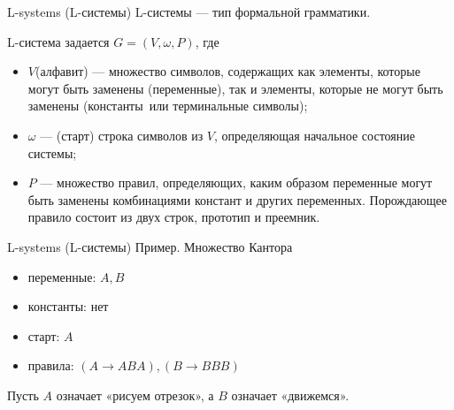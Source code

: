 \documentclass{beamer}
\begin{document}
\begin{frame}{L-systems (L-системы)}
	L-системы --- тип формальной грамматики.

	L-система задается $G = (V, \omega, P )$, где

	\begin{itemize}
		\item $V$(алфавит) --- множество символов, содержащих как элементы, которые могут быть заменены (переменные), так и элементы, которые не могут быть заменены (\textquotedbl константы\textquotedbl~или \textquotedbl терминальные символы\textquotedbl);
		\item $\omega$ --- (старт) строка символов из $V$, определяющая начальное состояние системы;
		\item $P$ --- множество правил, определяющих, каким образом переменные могут быть заменены комбинациями констант и других переменных. Порождающее правило состоит из двух строк, прототип и преемник.
	\end{itemize}

\end{frame}

\begin{frame}{L-systems (L-системы)}
	Пример. Множество Кантора

	\begin{itemize}
		\item переменные: $A, B$
		\item константы: нет
		\item старт: $A$
		\item правила: $(A \to ABA), (B \to BBB)$
	\end{itemize}

	Пусть $A$ означает «рисуем отрезок», а $B$ означает «движемся».

\end{frame}
\end{document}

